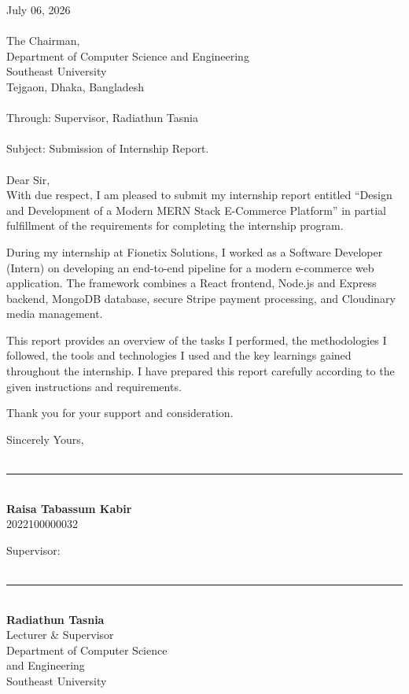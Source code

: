 \documentclass[12pt,a4paper]{report}
\begin{document}
\noindent July 06, 2026 \\\\
The Chairman,\\
Department of Computer Science and Engineering\\
Southeast University\\
Tejgaon, Dhaka, Bangladesh\\\\
Through: Supervisor, Radiathun Tasnia\\\\
Subject: Submission of Internship Report.\\\\
Dear Sir,\\
With due respect, I am pleased to submit my internship report entitled ``Design and Development of a Modern MERN Stack E-Commerce Platform'' in partial fulfillment of the requirements for completing the internship program.

During my internship at Fionetix Solutions, I worked as a Software Developer (Intern) on developing an end-to-end pipeline for a modern e-commerce web application. The framework combines a React frontend, Node.js and Express backend, MongoDB database, secure Stripe payment processing, and Cloudinary media management.

This report provides an overview of the tasks I performed, the methodologies I followed, the tools and technologies I used and the key learnings gained throughout the internship. I have prepared this report carefully according to the given instructions and requirements.

Thank you for your support and consideration.

\vspace{1.5cm}
\noindent
\begin{minipage}[t]{0.45\textwidth}
Sincerely Yours,\\
\vspace{1.5cm}\\
\rule{5cm}{0.4pt}\\
\textbf{Raisa Tabassum Kabir}\\
2022100000032
\end{minipage}
\hfill
\begin{minipage}[t]{0.45\textwidth}
Supervisor:\\
\vspace{1.5cm}\\
\rule{5cm}{0.4pt}\\
\textbf{Radiathun Tasnia}\\
Lecturer \& Supervisor\\
Department of Computer Science\\
and Engineering\\
Southeast University
\end{minipage}
\end{document}
